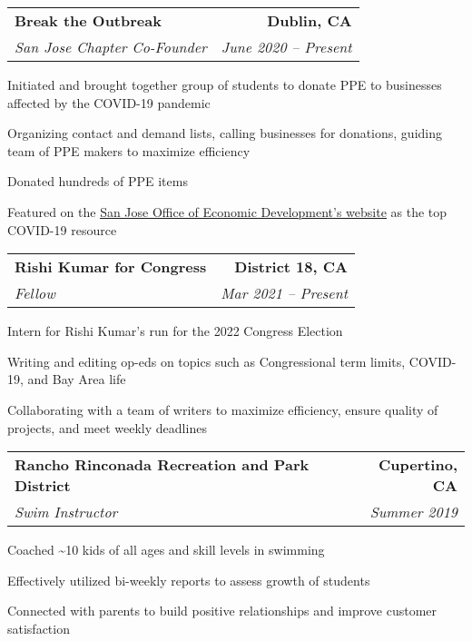 \documentclass{article}
\newlength{\secskip}
\begin{document}
\goodbreak\vspace{\secskip}\par\noindent\begin{tabularx}{\linewidth}{Xr}
    \textbf{Break the Outbreak} & \textbf{Dublin, CA}\\
    \textit{San Jose Chapter Co-Founder} & \textit{June 2020 -- Present}\\
\end{tabularx}
\begin{compactitem}
    \item Initiated and brought together group of students to donate PPE to businesses affected by the COVID-19 pandemic
    \item Organizing contact and demand lists, calling businesses for donations, guiding team of PPE makers to maximize efficiency
    \item Donated hundreds of PPE items
    \item Featured on the \href{https://www.sjeconomy.com/why-san-jose/covid-19-guidance/local-suppliers}{\underline{San Jose Office of Economic Development's website}} as the top COVID-19 resource
\end{compactitem}

\goodbreak\vspace{\secskip}\par\noindent\begin{tabularx}{\linewidth}{Xr}
    \textbf{Rishi Kumar for Congress} & \textbf{District 18, CA}\\
    \textit{Fellow} & \textit{Mar 2021 -- Present}\\
\end{tabularx}
\begin{compactitem}
    \item Intern for Rishi Kumar's run for the 2022 Congress Election
    \item Writing and editing op-eds on topics such as Congressional term limits, COVID-19, and Bay Area life
    \item Collaborating with a team of writers to maximize efficiency, ensure quality of projects, and meet weekly deadlines
\end{compactitem}

\goodbreak\vspace{\secskip}\par\noindent\begin{tabularx}{\linewidth}{Xr}
    \textbf{Rancho Rinconada Recreation and Park District} & \textbf{Cupertino, CA}\\
    \textit{Swim Instructor} & \textit{Summer 2019}\\
\end{tabularx}
\begin{compactitem}
    \item Coached \textasciitilde{}10 kids of all ages and skill levels in swimming
    \item Effectively utilized bi-weekly reports to assess growth of students
    \item Connected with parents to build positive relationships and improve customer satisfaction
\end{compactitem}

    
\end{document}
